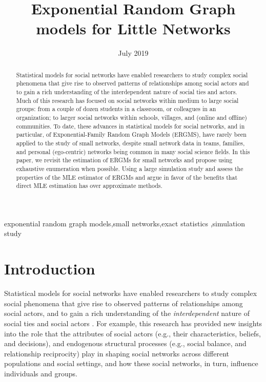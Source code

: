 \documentclass[review]{elsarticle}
\title{Exponential Random Graph models for Little Networks} %
\author{}
\date{July 2019}
\begin{document}
\begin{abstract}
    Statistical models for social networks have enabled researchers to study complex social phenomena that give rise to observed patterns of relationships among social actors and to gain a rich understanding of the interdependent nature of social ties and actors. Much of this research has focused on social networks within medium to large social groups: from a couple of dozen students in a classroom, or colleagues in an organization; to larger social networks within schools, villages, and (online and offline) communities. To date, these advances in statistical models for social networks, and in particular, of Exponential-Family Random Graph Models (ERGMS), have rarely been applied to the study of small networks, despite small network data in teams, families, and personal (ego-centric) networks being common in many social science fields. In this paper, we revisit the estimation of ERGMs for small networks and propose using exhaustive enumeration when possible. Using a large simulation study and assess the properties of the MLE estimator of ERGMs and argue in favor of the benefits that direct MLE estimation has over approximate methods.
\end{abstract}

\begin{keyword}
exponential random graph models\sep small networks\sep exact statistics \sep simulation study
\end{keyword}

\maketitle


\section{Introduction}

Statistical models for social networks have enabled researchers to study complex social phenomena that give rise to observed patterns of relationships among social actors, and to gain a rich understanding of the \textit{interdependent} nature of social ties and social actors \cite{Snijders2011,lusher2012exponential}. For example, this research has provided new insights into the role that the attributes of social actors (e.g., their characteristics, beliefs, and decisions), and endogenous structural processes (e.g., social balance, and relationship reciprocity) play in shaping social networks across different populations and social settings, and how  these social networks, in turn, influence individuals and groups. 
\end{document}
